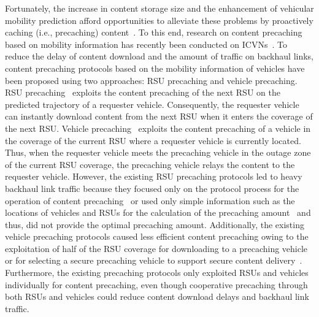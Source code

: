 \documentclass[electronics,aricle,accept,pdftex,moreauthors]{Definitions/mdpi}
\begin{document}
Fortunately, the increase in content storage size and the enhancement of vehicular mobility prediction afford opportunities to alleviate these problems by proactively caching (i.e., precaching) content~\cite{Wang2016Mobility}. 
To this end, research on content precaching based on mobility information has recently been conducted on ICVNs~\cite{Rao2013Proactive, Wu2013Adaptive, Grewe2016PeRCeIVE, Lai2017SIRC}. 
To reduce the delay of content download and the amount of traffic on backhaul links, content precaching protocols based on the mobility information of vehicles have been proposed using two approaches: RSU precaching and vehicle precaching. RSU precaching~\cite{Rao2013Proactive, Grewe2016PeRCeIVE} exploits the content precaching of the next RSU on the predicted trajectory of a requester vehicle. Consequently, the requester vehicle can instantly download content from the next RSU when it enters the coverage of the next RSU. Vehicle precaching~\cite{Wu2013Adaptive, Lai2017SIRC} exploits the content precaching of a vehicle in the coverage of the current RSU where a requester vehicle is currently located. Thus, when the requester vehicle meets the precaching vehicle in the outage zone of the current RSU coverage, the precaching vehicle relays the content to the requester vehicle. However, the existing RSU precaching protocols led to heavy backhaul link traffic because they focused only on the protocol process for the operation of content precaching~\cite{Rao2013Proactive} or used only simple information such as the locations of vehicles and RSUs for the calculation of the precaching amount~\cite{Grewe2016PeRCeIVE} and thus, did not provide the optimal precaching amount. Additionally, the existing vehicle precaching protocols caused less efficient content precaching owing to the exploitation of half of the RSU coverage for downloading to a precaching vehicle~\cite{Wu2013Adaptive} or for selecting a secure precaching vehicle to support secure content delivery~\cite{Lai2017SIRC}.
Furthermore, the existing precaching protocols only exploited RSUs and vehicles individually for content precaching, even though cooperative precaching through both RSUs and vehicles could reduce content download delays and backhaul link traffic.
\end{document}
